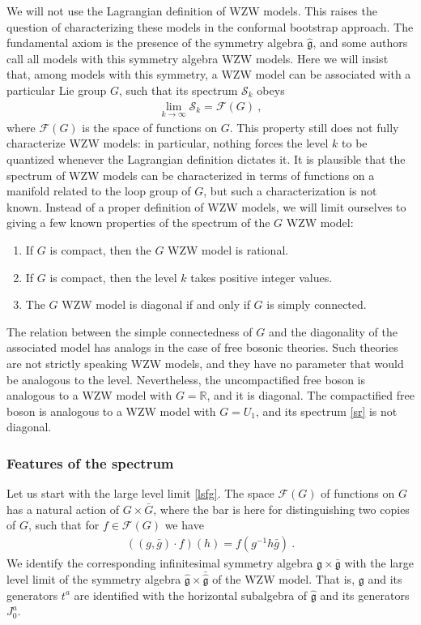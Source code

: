 \documentclass[12pt, a4paper, notitlepage, twoside]{report}
\numberwithin{equation}{section}
\theoremstyle{break}
\begin{document}
We will not use the Lagrangian definition of WZW models.
This raises the question of characterizing these models in the conformal bootstrap approach.
The fundamental axiom is the presence of the symmetry algebra $\hat{\mathfrak{g}}$, and some  authors call all models with this symmetry algebra WZW models.
Here we will insist that, among models with this symmetry, 
a WZW model can be associated with a particular Lie group $G$, such that its spectrum $\mathcal{S}_k$ obeys
\begin{align}
 \boxed{\underset{k\to \infty}{\lim} \mathcal{S}_k = \mathcal{F}(G)}\ ,
\label{lsfg}
\end{align}
where $\mathcal{F}(G)$ is the space of functions on $G$.
This property still does not fully characterize WZW models: in particular, nothing forces the level $k$ to be quantized whenever the Lagrangian definition dictates it.
It is plausible that the spectrum of WZW models can be characterized in terms of functions on a manifold related to the loop group of $G$, but such a characterization is not known.
Instead of a proper definition of WZW models, we will limit ourselves to giving a few known properties of the spectrum of the $G$ WZW model:
\begin{enumerate}
 \item If $G$ is compact, then the $G$ WZW model is rational.
\item If $G$ is compact, then the level $k$ takes positive integer values.
\item The $G$ WZW model is diagonal if and only if $G$ is simply connected. 
\end{enumerate}
The relation between the simple connectedness of $G$ and the diagonality of the associated model 
has analogs in the case of free bosonic theories. Such theories are not strictly speaking WZW models, and they have no parameter that would be analogous to the level. Nevertheless, the uncompactified free boson is analogous to a WZW model with $G=\mathbb{R}$, and it is diagonal. The compactified free boson is analogous to a WZW model with $G=U_1$, and its spectrum \eqref{sr} is not diagonal. 

\subsubsection{Features of the spectrum}

Let us start with the large level limit \eqref{lsfg}.
The space $\mathcal{F}(G)$ of functions on $G$ has a natural action of 
$G\times \bar{G}$, where the bar is here for distinguishing two copies of $G$, such that for $f\in \mathcal{F}(G)$ we have 
\begin{align}
\left( (g,\bar{g})\cdot f\right)(h) = f(g^{-1}h\bar{g})\ .
\end{align}
We identify the corresponding infinitesimal symmetry algebra $\mathfrak{g}\times \bar{\mathfrak{g}}$ with the large level limit of the symmetry algebra $\hat{\mathfrak{g}}\times \bar{\hat{\mathfrak{g}}}$ of the WZW model.
That is, $\mathfrak{g}$ and its generators $t^a$ are identified with the horizontal subalgebra of $\hat{\mathfrak{g}}$ and its generators $J^a_0$.
\end{document}
